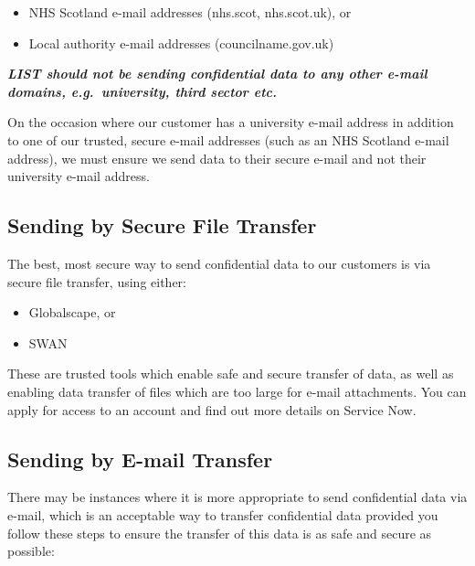 \documentclass[
]{book}
\begin{document}
\begin{itemize}
\item
  NHS Scotland e-mail addresses (nhs.scot, nhs.scot.uk), or
\item
  Local authority e-mail addresses (councilname.gov.uk)
\end{itemize}

\emph{\textbf{LIST should not be sending confidential data to any other e-mail domains, e.g.~university, third sector etc.}}

On the occasion where our customer has a university e-mail address in addition to one of our trusted, secure e-mail addresses (such as an NHS Scotland e-mail address), we must ensure we send data to their secure e-mail and not their university e-mail address.

\hypertarget{sending-by-secure-file-transfer}{%
\subsection{Sending by Secure File Transfer}\label{sending-by-secure-file-transfer}}

The best, most secure way to send confidential data to our customers is via secure file transfer, using either:

\begin{itemize}
\item
  Globalscape, or
\item
  SWAN
\end{itemize}

These are trusted tools which enable safe and secure transfer of data, as well as enabling data transfer of files which are too large for e-mail attachments. You can apply for access to an account and find out more details on Service Now.

\hypertarget{sending-by-e-mail-transfer}{%
\subsection{Sending by E-mail Transfer}\label{sending-by-e-mail-transfer}}

There may be instances where it is more appropriate to send confidential data via e-mail, which is an acceptable way to transfer confidential data provided you follow these steps to ensure the transfer of this data is as safe and secure as possible:
\end{document}

